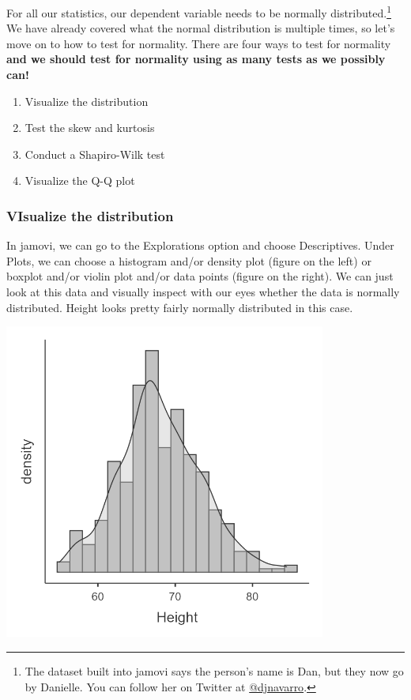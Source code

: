 \documentclass[
]{book}
\providecommand{\tightlist}{%
  \setlength{\itemsep}{0pt}\setlength{\parskip}{0pt}}
\begin{document}
For all our statistics, our dependent variable needs to be normally distributed.\footnote{The dataset built into jamovi says the person's name is Dan, but they now go by Danielle. You can follow her on Twitter at \href{https://twitter.com/djnavarro}{@djnavarro}.} We have already covered what the normal distribution is multiple times, so let's move on to how to test for normality. There are four ways to test for normality \textbf{and we should test for normality using as many tests as we possibly can!}

\begin{enumerate}
\def\labelenumi{\arabic{enumi}.}
\tightlist
\item
  Visualize the distribution
\item
  Test the skew and kurtosis
\item
  Conduct a Shapiro-Wilk test
\item
  Visualize the Q-Q plot
\end{enumerate}

\hypertarget{visualize-the-distribution}{%
\subsubsection{VIsualize the distribution}\label{visualize-the-distribution}}

In jamovi, we can go to the Explorations option and choose Descriptives. Under Plots, we can choose a histogram and/or density plot (figure on the left) or boxplot and/or violin plot and/or data points (figure on the right). We can just look at this data and visually inspect with our eyes whether the data is normally distributed. Height looks pretty fairly normally distributed in this case.

\includegraphics[width=4.16667in,height=\textheight]{images/06-inferential/histogram.png}
\end{document}

